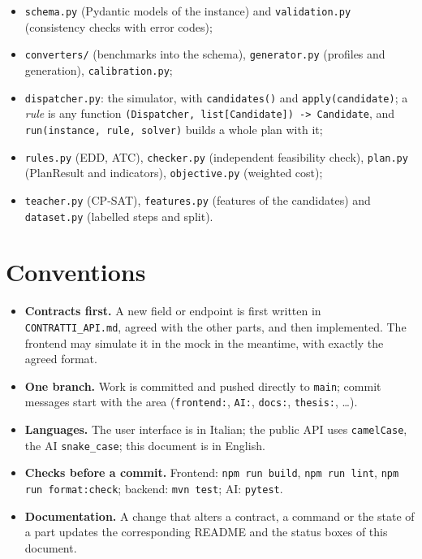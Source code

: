 \begin{itemize}
  \item \texttt{schema.py} (Pydantic models of the instance) and \texttt{validation.py}
        (consistency checks with error codes);
  \item \texttt{converters/} (benchmarks into the schema), \texttt{generator.py} (profiles and
        generation), \texttt{calibration.py};
  \item \texttt{dispatcher.py}: the simulator, with \texttt{candidates()} and
        \texttt{apply(candidate)}; a \emph{rule} is any function
        \texttt{(Dispatcher, list[Candidate]) -> Candidate}, and \texttt{run(instance, rule,
        solver)} builds a whole plan with it;
  \item \texttt{rules.py} (EDD, ATC), \texttt{checker.py} (independent feasibility check),
        \texttt{plan.py} (PlanResult and indicators), \texttt{objective.py} (weighted cost);
  \item \texttt{teacher.py} (CP-SAT), \texttt{features.py} (features of the candidates) and
        \texttt{dataset.py} (labelled steps and split).
\end{itemize}

\section{Conventions}
\label{sec:dev-conventions}

\begin{itemize}
  \item \textbf{Contracts first.} A new field or endpoint is first written in
        \texttt{CONTRATTI\_API.md}, agreed with the other parts, and then implemented. The
        frontend may simulate it in the mock in the meantime, with exactly the agreed format.
  \item \textbf{One branch.} Work is committed and pushed directly to \texttt{main}; commit
        messages start with the area (\texttt{frontend:}, \texttt{AI:}, \texttt{docs:},
        \texttt{thesis:}, \dots).
  \item \textbf{Languages.} The user interface is in Italian; the public API uses
        \texttt{camelCase}, the AI \texttt{snake\_case}; this document is in English.
  \item \textbf{Checks before a commit.} Frontend: \texttt{npm run build}, \texttt{npm run lint},
        \texttt{npm run format:check}; backend: \texttt{mvn test}; AI: \texttt{pytest}.
  \item \textbf{Documentation.} A change that alters a contract, a command or the state of a part
        updates the corresponding README and the status boxes of this document.
\end{itemize}

